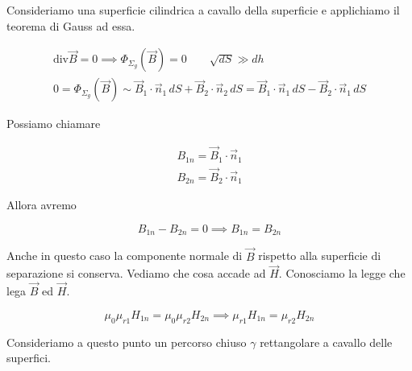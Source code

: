 Consideriamo una superficie cilindrica a cavallo della superficie e applichiamo il teorema di Gauss ad essa.

\begin{gather*}
	\text{div}\vec{B} =0 \implies \Phi_{\Sigma_g}(\vec{B} )=0 \qquad \sqrt{dS} \gg dh \\
	0=\Phi_{\Sigma_g}(\vec{B} ) \sim \vec{B}_1 \cdot \vec{n}_1\,dS + \vec{B}_2 \cdot \vec{n}_2\,dS = \vec{B}_1 \cdot \vec{n}_1\,dS - \vec{B}_2 \cdot \vec{n}_1\,dS
\end{gather*}

Possiamo chiamare

\begin{gather*}
	B_{1n}=\vec{B}_1\cdot \vec{n}_1\\
	B_{2n}=\vec{B}_2\cdot \vec{n}_1
\end{gather*}

Allora avremo

\[
	B_{1n}-B_{2n}=0 \implies \boxed{B_{1n}=B_{2n}}
\]

Anche in questo caso la componente normale di $\vec{B}$ rispetto alla superficie di separazione si conserva. Vediamo che cosa accade ad $\vec{H}$. Conosciamo la legge che lega $\vec{B}$ ed $\vec{H}$.

\[
	\mu_0 \mu_{r1} H_{1n} = \mu_0 \mu_{r2} H_{2n} \implies \boxed{\mu_{r1} H_{1n} = \mu_{r2} H_{2n}}
\]

Consideriamo a questo punto un percorso chiuso $\gamma$ rettangolare a cavallo delle superfici.

